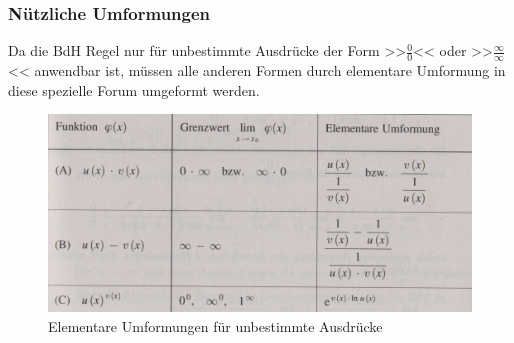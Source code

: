 \subsubsection*{Nützliche Umformungen}
Da die BdH Regel nur für unbestimmte Ausdrücke der Form >>$\frac{0}{0}$<< oder >>$\frac{\infty}{\infty}$<< anwendbar ist, müssen alle anderen Formen durch elementare Umformung in diese spezielle Forum umgeformt werden.
\begin{figure}[H]
\centering 
	\includegraphics[width=1\textwidth]{Bilder/bdh-umformungstabelle}
\caption{Elementare Umformungen für unbestimmte Ausdrücke}
\end{figure} 
